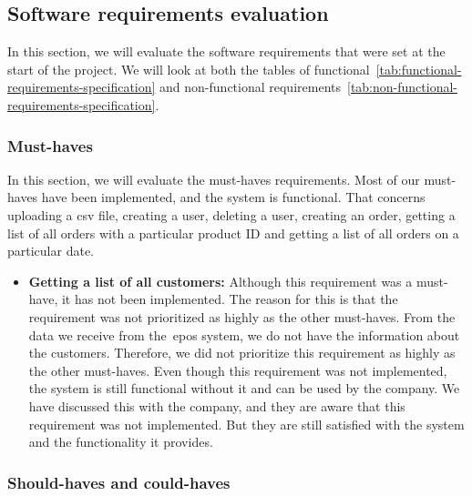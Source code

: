 \subsection{Software requirements evaluation}\label{subsec:software-requirements-evaluation}

In this section, we will evaluate the software requirements that were set at the start of the project.
We will look at both the tables of functional~\ref{tab:functional-requirements-specification}
and non-functional requirements~\ref{tab:non-functional-requirements-specification}.

\subsubsection{Must-haves}\label{subsubsec:must-haves}

In this section, we will evaluate the must-haves requirements.
Most of our must-haves have been implemented, and the system is functional.
That concerns uploading a csv file, creating a user, deleting a user, creating an order, getting a list of all orders
with a particular product ID and getting a list of all orders on a particular date.

\begin{itemize}
    \item \textbf{Getting a list of all customers:}
    Although this requirement was a must-have, it has not been implemented.
    The reason for this is that the requirement was not prioritized as highly as the other must-haves.
    From the data we receive from the~\acrshort{epos} system, we do not have the information about the customers.
    Therefore, we did not prioritize this requirement as highly as the other must-haves.
    Even though this requirement was not implemented, the system is still functional without it and can be used by the
    company. %
    We have discussed this with the company, and they are aware that this requirement was not implemented.
    But they are still satisfied with the system and the functionality it provides.
\end{itemize}

\subsubsection{Should-haves and could-haves}\label{subsubsec:should-haves-and-could-haves}

